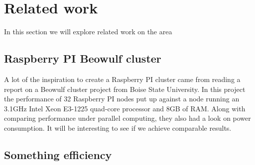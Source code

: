 \clearpage
\section{Related work}
In this section we will explore related work on the area
\subsection{Raspberry PI Beowulf cluster}
A lot of the inspiration to create a Raspberry PI cluster came from reading a report on a Beowulf cluster project from Boise State University.\cite{RPI_BEOWULF} In this project the performance of 32 Raspberry PI nodes put up against a node running an 3.1GHz Intel Xeon E3-1225 quad-core processor and 8GB of RAM. Along with comparing performance under parallel computing, they also had a look on power consumption. It will be interesting to see if we achieve comparable results. 

\subsection{Something efficiency}
\cite{energi_efficiency}
